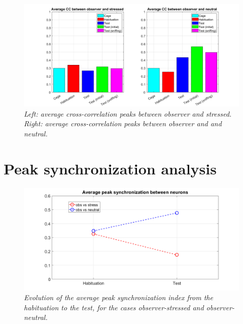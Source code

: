 \documentclass[12pt, a4paper]{report}
\begin{document}
\begin{figure}[H]
	
	\begin{center}
		\hspace*{-1.4cm}
		\includegraphics[scale=.5]{cc_average.png} 
	\end{center} 
	\caption{\textit{Left: average cross-correlation peaks between observer and stressed. Right: average cross-correlation peaks between observer and and neutral.}}
	\label{cc_average}
\end{figure}



\section{Peak synchronization analysis}

\begin{figure}[H]
	
	\begin{center}
		\hspace*{-1cm}
		\includegraphics[scale=.45]{avg_pks.png} 
	\end{center} 
	\caption{\textit{Evolution of the average peak synchronization index from the habituation to the test, for the cases observer-stressed and observer-neutral.}} \label{avg_pks}
	
\end{figure}
\end{document}
